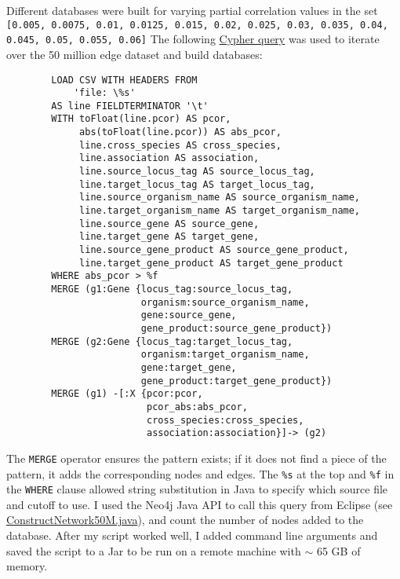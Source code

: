 \documentclass[12pt]{article}
\begin{document}
Different databases were built for varying partial correlation values in the set \texttt{[0.005,  0.0075,  0.01,  0.0125,  0.015,  0.02,  0.025,  0.03,  0.035,  0.04,  0.045,  0.05,  0.055,  0.06]}
The following \href{https://github.com/JanetMatsen/Neo4j_meta4/blob/master/data_mining_Neo4j_v2_3_2/queries/load_network--specify_cutoff.txt}{Cypher query} was used to iterate over the 50 million edge dataset and build databases:

\begin{verbatim}
        LOAD CSV WITH HEADERS FROM
            'file: \%s'
        AS line FIELDTERMINATOR '\t'
        WITH toFloat(line.pcor) AS pcor,
             abs(toFloat(line.pcor)) AS abs_pcor,
             line.cross_species AS cross_species,
             line.association AS association,
             line.source_locus_tag AS source_locus_tag,
             line.target_locus_tag AS target_locus_tag,
             line.source_organism_name AS source_organism_name,
             line.target_organism_name AS target_organism_name,
             line.source_gene AS source_gene,
             line.target_gene AS target_gene,
             line.source_gene_product AS source_gene_product,
             line.target_gene_product AS target_gene_product
        WHERE abs_pcor > %f
        MERGE (g1:Gene {locus_tag:source_locus_tag,
                        organism:source_organism_name,
                        gene:source_gene,
                        gene_product:source_gene_product})
        MERGE (g2:Gene {locus_tag:target_locus_tag,
                        organism:target_organism_name,
                        gene:target_gene,
                        gene_product:target_gene_product})
        MERGE (g1) -[:X {pcor:pcor,
                         pcor_abs:abs_pcor,
                         cross_species:cross_species,
                         association:association}]-> (g2)
\end{verbatim}

The \texttt{MERGE} operator ensures the pattern exists; if it does not find a piece of the pattern, it adds the corresponding nodes and edges. 
The \texttt{\%s} at the top and \texttt{\%f} in the \texttt{WHERE} clause allowed string substitution in Java to specify which source file and cutoff to use. 
I used the Neo4j Java API to call this query from Eclipse (see \href{https://github.com/JanetMatsen/Neo4j_meta4/blob/master/data_mining_Neo4j_v2_3_2/src/ConstructNetwork50M.java}{ConstructNetwork50M.java}), and count the number of nodes added to the database. 
After my script worked well, I added command line arguments and saved the script to a Jar to be run on a remote machine with $\sim$ 65 GB of memory.
\end{document}
